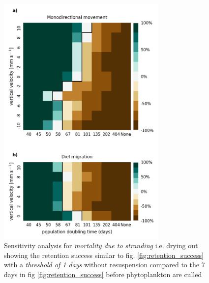 \documentclass[npg, manuscript]{copernicus}
\begin{document}
\appendixfigures  %

\begin{figure}
    \includegraphics[width=8.3cm]{retention_success_sa_26.png}
    \caption[]{
        Sensitivity analysis for \textit{mortality due to stranding} i.e. drying out showing the retention success similar to fig. \ref{fig:retention_success} with a \textit{threshold of 1 days} without resuspension compared to the 7 days in fig \ref{fig:retention_success} before phytoplankton are culled
    }
    \label{fig:retention_success_short_stranding}
\end{figure}
\clearpage
\end{document}
